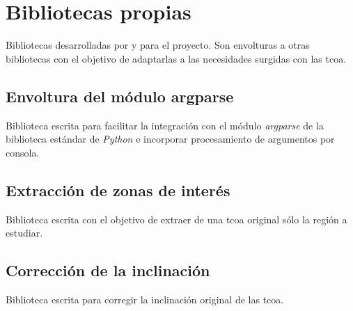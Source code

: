 \section{Bibliotecas propias}

Bibliotecas desarrolladas por y para el proyecto. Son envolturas a
otras bibliotecas con el objetivo de adaptarlas a las necesidades
surgidas con las \gls{tcoa}.

\subsection{Envoltura del módulo argparse}
Biblioteca escrita para facilitar la integración con el módulo
\emph{argparse} de la biblioteca estándar de \emph{Python} e incorporar
procesamiento de argumentos por consola.

\subsection{Extracción de zonas de interés}
Biblioteca escrita con el objetivo de extraer de una \gls{tcoa}
original sólo la región a estudiar.

\subsection{Corrección de la inclinación}
Biblioteca escrita para corregir la inclinación original de las \gls{tcoa}.